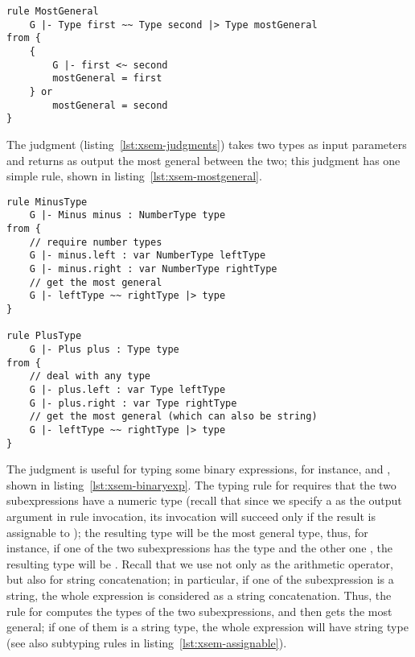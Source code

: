 \begin{lstlisting}[language=xsemantics,float,label=lst:xsem-mostgeneral,caption=Rule
for \mytt{mostGeneral}.] 
rule MostGeneral
	G |- Type first ~~ Type second |> Type mostGeneral
from {
	{
		G |- first <~ second
		mostGeneral = first
	} or
		mostGeneral = second
}
\end{lstlisting}

The judgment  (listing~\ref{lst:xsem-judgments}) takes two
types as input parameters and returns as output the most general between the
two; this judgment has one simple rule, shown in
listing~\ref{lst:xsem-mostgeneral}.

\begin{lstlisting}[language=xsemantics,float,label=lst:xsem-binaryexp,caption=Some
rules for binary expressions.] 
rule MinusType
	G |- Minus minus : NumberType type
from {
	// require number types
	G |- minus.left : var NumberType leftType
	G |- minus.right : var NumberType rightType
	// get the most general
	G |- leftType ~~ rightType |> type
}

rule PlusType
	G |- Plus plus : Type type
from {
	// deal with any type
	G |- plus.left : var Type leftType
	G |- plus.right : var Type rightType
	// get the most general (which can also be string)
	G |- leftType ~~ rightType |> type
}
\end{lstlisting}

The judgment  is useful for typing some binary expressions,
for instance,  and , shown in
listing~\ref{lst:xsem-binaryexp}.  The typing rule for  requires
that the two subexpressions have a numeric type (recall that since we specify a
 as the output argument in rule invocation, its invocation
will succeed only if the result is assignable to ); the
resulting type will be the most general type, thus, for instance, if one of the
two subexpressions has the type  and the other one
, the resulting type will be .  Recall that we use \mytt{+} not
only as the arithmetic operator, but also for string concatenation; in
particular, if one of the subexpression is a string, the whole expression is
considered as a string concatenation.  Thus, the rule for 
computes the types of the two subexpressions, and then gets the most general; if one of them
is a string type, the whole expression will have string type (see also subtyping
rules in listing~\ref{lst:xsem-assignable}).

